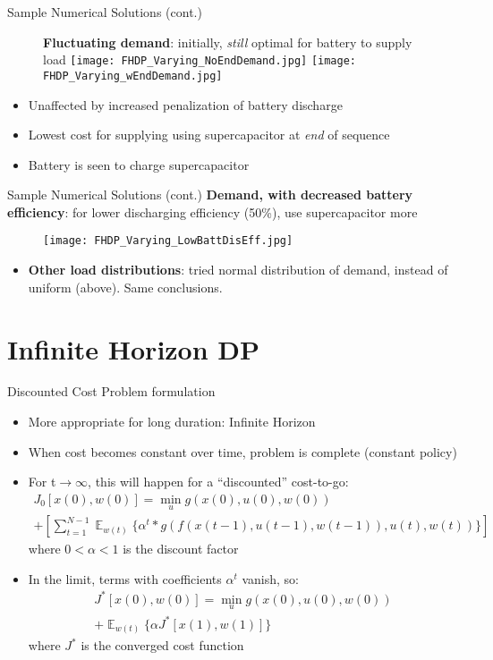 \documentclass{beamer}
\DeclareMathOperator{\E}{\mathbb{E}}
\begin{document}
\begin{frame}{Sample Numerical Solutions (cont.)}
	\begin{figure}
		\textbf{Fluctuating demand}: initially, \textit{still} optimal for battery to supply load
		\texttt{[image: FHDP\_Varying\_NoEndDemand.jpg]}
		\texttt{[image: FHDP\_Varying\_wEndDemand.jpg]}
	\end{figure}
	\begin{itemize}
		\item Unaffected by increased penalization of battery discharge
		\item Lowest cost for supplying using supercapacitor at \textit{end} of sequence
		\item Battery is seen to charge supercapacitor
	\end{itemize}
\end{frame}

\begin{frame}{Sample Numerical Solutions (cont.)}
	\textbf{Demand, with decreased battery efficiency}: for lower discharging efficiency (50\%), use supercapacitor more
	\begin{figure}
	 	\texttt{[image: FHDP\_Varying\_LowBattDisEff.jpg]}
	 \end{figure}
\begin{itemize}
	\item \textbf{Other load distributions}: tried normal distribution of demand, instead of uniform (above). Same conclusions.
\end{itemize}
\end{frame}



\section{Infinite Horizon DP}
\begin{frame}{Discounted Cost Problem formulation}
\begin{itemize}
	\item More appropriate for long duration: Infinite Horizon
	\item When cost becomes constant over time, problem is complete (constant policy)
	\item For t$\to\infty$, this will happen for a “discounted” cost-to-go:
	\begin{multline}
	J_{0}[x(0),w(0)]=\min_{u} g(x(0),u(0),w(0))\\
	+\left[\sum_{t=1}^{N-1}\mathop{\E}_{w(t)} \{
	\alpha^{t}*g( f(x(t-1),u(t-1),w(t-1)) ,u(t),w(t))
	\}\right]
	\end{multline}
	where $0<\alpha<1$ is the discount factor
	\item In the limit, terms with coefficients $\alpha^{t}$ vanish, so:
	\begin{multline}
	J^{*}[x(0),w(0)]=\min_{u} g(x(0),u(0),w(0))\\
	+\mathop{\E}_{w(t)} \{\alpha J^{*}[x(1),w(1)]
	\}
	\end{multline}
	where $J^{*}$ is the converged cost function
\end{itemize}
\end{frame}
\end{document}
